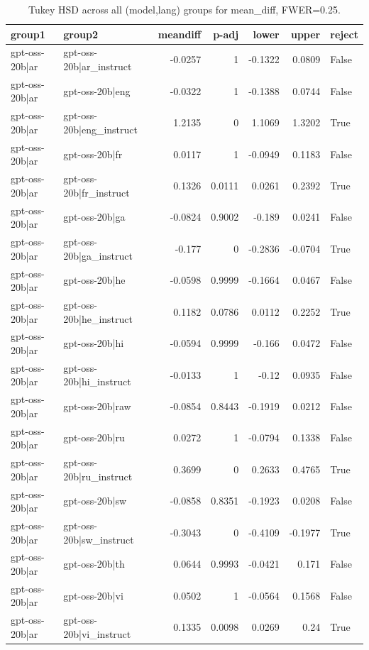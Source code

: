 \begin{table}
\caption{Tukey HSD across all (model,lang) groups for mean_diff, FWER=0.25.}
\label{tab:tukey_all_models_all_langs_mean_diff}
\begin{tabular}{l l r r r r l}
\toprule
group1 & group2 & meandiff & p-adj & lower & upper & reject \\
\midrule
gpt-oss-20b|ar & gpt-oss-20b|ar_instruct & -0.0257 & 1 & -0.1322 & 0.0809 & False \\
gpt-oss-20b|ar & gpt-oss-20b|eng & -0.0322 & 1 & -0.1388 & 0.0744 & False \\
gpt-oss-20b|ar & gpt-oss-20b|eng_instruct & 1.2135 & 0 & 1.1069 & 1.3202 & True \\
gpt-oss-20b|ar & gpt-oss-20b|fr & 0.0117 & 1 & -0.0949 & 0.1183 & False \\
gpt-oss-20b|ar & gpt-oss-20b|fr_instruct & 0.1326 & 0.0111 & 0.0261 & 0.2392 & True \\
gpt-oss-20b|ar & gpt-oss-20b|ga & -0.0824 & 0.9002 & -0.189 & 0.0241 & False \\
gpt-oss-20b|ar & gpt-oss-20b|ga_instruct & -0.177 & 0 & -0.2836 & -0.0704 & True \\
gpt-oss-20b|ar & gpt-oss-20b|he & -0.0598 & 0.9999 & -0.1664 & 0.0467 & False \\
gpt-oss-20b|ar & gpt-oss-20b|he_instruct & 0.1182 & 0.0786 & 0.0112 & 0.2252 & True \\
gpt-oss-20b|ar & gpt-oss-20b|hi & -0.0594 & 0.9999 & -0.166 & 0.0472 & False \\
gpt-oss-20b|ar & gpt-oss-20b|hi_instruct & -0.0133 & 1 & -0.12 & 0.0935 & False \\
gpt-oss-20b|ar & gpt-oss-20b|raw & -0.0854 & 0.8443 & -0.1919 & 0.0212 & False \\
gpt-oss-20b|ar & gpt-oss-20b|ru & 0.0272 & 1 & -0.0794 & 0.1338 & False \\
gpt-oss-20b|ar & gpt-oss-20b|ru_instruct & 0.3699 & 0 & 0.2633 & 0.4765 & True \\
gpt-oss-20b|ar & gpt-oss-20b|sw & -0.0858 & 0.8351 & -0.1923 & 0.0208 & False \\
gpt-oss-20b|ar & gpt-oss-20b|sw_instruct & -0.3043 & 0 & -0.4109 & -0.1977 & True \\
gpt-oss-20b|ar & gpt-oss-20b|th & 0.0644 & 0.9993 & -0.0421 & 0.171 & False \\
gpt-oss-20b|ar & gpt-oss-20b|vi & 0.0502 & 1 & -0.0564 & 0.1568 & False \\
gpt-oss-20b|ar & gpt-oss-20b|vi_instruct & 0.1335 & 0.0098 & 0.0269 & 0.24 & True \\

\end{tabular}
\end{table}
